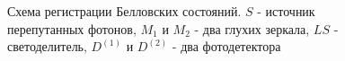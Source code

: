 \begin{figure}
\centering


\caption{Схема регистрации Белловских состояний. $S$ - источник
  перепутанных фотонов, $M_1$ и $M_2$ - два глухих зеркала, $LS$ - светоделитель,
  $D^{(1)}$ и $D^{(2)}$ - два фотодетектора}
\label{figBellReg}
\end{figure}
